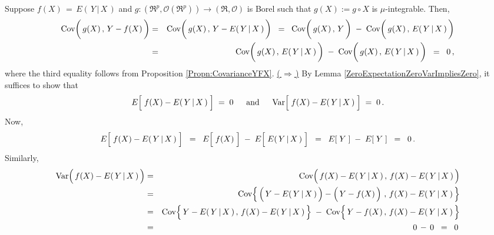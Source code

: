 Suppose $f(X) \,=\, E\!\left(\,Y\,\vert\,X\,\right)$ and
$g : (\Re^{p},\mathcal{O}(\Re^{p}))\longrightarrow (\Re,\mathcal{O})$
is Borel such that $g(X) := g \circ X$ is $\mu$-integrable.
Then,
\begin{eqnarray*}
\Cov\!\left(\,\overset{{\color{white}\vert}}{g}(X)\,,\,Y-f(X)\,\right)
&=&
	\Cov\!\left(\,\overset{{\color{white}\vert}}{g}(X)\,,\,Y-E\!\left(\,Y\,\vert\,X\,\right)\,\right)
\;\;=\;\;
	\Cov\!\left(\,\overset{{\color{white}\vert}}{g}(X)\,,\,Y\,\right)
	\; - \;
	\Cov\!\left(\,\overset{{\color{white}\vert}}{g}(X)\,,\,E\!\left(\,Y\,\vert\,X\,\right)\,\right)
\\
&=&
	\Cov\!\left(\,\overset{{\color{white}\vert}}{g}(X)\,,\,E\!\left(\,Y\,\vert\,X\,\right)\,\right)
	\; - \;
	\Cov\!\left(\,\overset{{\color{white}\vert}}{g}(X)\,,\,E\!\left(\,Y\,\vert\,X\,\right)\,\right)
\;\;=\;\;
	0\,,
\end{eqnarray*}
where the third equality follows from Proposition \ref{Propn:CovarianceYFX}.
\vskip 0.3cm
\noindent
\underline{(\,$\Longrightarrow$\,)}\quad
By Lemma \ref{ZeroExpectationZeroVarImpliesZero}, it suffices to show that
\begin{equation*}
E\!\left[\;f(X) \overset{{\color{white}.}}{-} E(\,Y\,\vert\,X\,)\;\right] \;=\; 0
\quad\;\;\textnormal{and}\quad\;\;
\Var\!\left[\;f(X) \overset{{\color{white}.}}{-} E(\,Y\,\vert\,X\,)\;\right] \;=\; 0\,.
\end{equation*}
Now,
\begin{equation*}
E\!\left[\;f(X) \overset{{\color{white}.}}{-} E(\,Y\,\vert\,X\,)\;\right]
\;\;=\;\;
	E\!\left[\;\overset{{\color{white}.}}{f}(X)\;\right]
	\;-\;
	E\!\left[\;\overset{{\color{white}.}}{E}(\,Y\,\vert\,X\,)\;\right]
\;\;=\;\;
	E\!\left[\;Y\;\right]
	\;-\;
	E\!\left[\;Y\;\right]
\;\;=\;\;
	0\,.
\end{equation*}
Similarly,
\begin{eqnarray*}
\Var\!\left(\,f(X) \overset{{\color{white}.}}{-} E(\,Y\,\vert\,X\,)\,\right)
&=&
	\Cov\!\left(\,f(X) \overset{{\color{white}.}}{-} E(\,Y\,\vert\,X\,)\,,\,f(X) \overset{{\color{white}.}}{-} E(\,Y\,\vert\,X\,)\,\right)
\\
&=&
	\Cov\!\left\{\,
		\left(\,Y \overset{{\color{white}.}}{-} E(\,Y\,\vert\,X\,)\,\right) - \left(\,Y \overset{{\color{white}.}}{-} f(X)\,\right)
		\,,\,
		f(X) \overset{{\color{white}.}}{-} E(\,Y\,\vert\,X\,)
		\,\right\}
\\
&=&
	\Cov\!\left\{\,
		Y \overset{{\color{white}.}}{-} E(\,Y\,\vert\,X\,)
		\,,\,
		f(X) \overset{{\color{white}.}}{-} E(\,Y\,\vert\,X\,)
		\,\right\}
	\;-\;
	\Cov\!\left\{\,
		Y \overset{{\color{white}.}}{-} f(X)
		\,,\,
		f(X) \overset{{\color{white}.}}{-} E(\,Y\,\vert\,X\,)
		\,\right\}
\\
&=&
	0 \,-\, 0
	\;\; = \;\;
	0\,
\end{eqnarray*}
